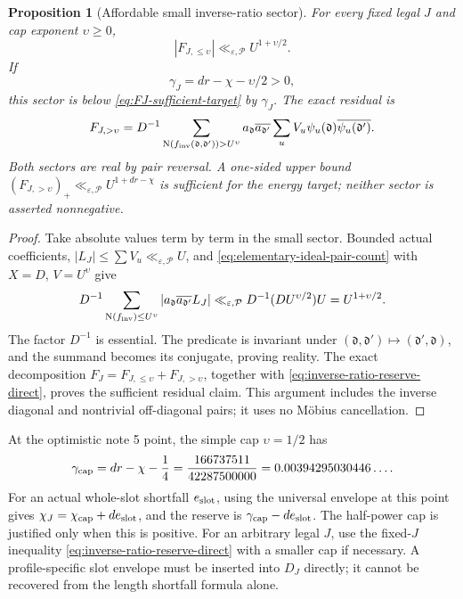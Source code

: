\documentclass[11pt]{article}
\newtheorem{proposition}[theorem]{Proposition}
\theoremstyle{definition}
\newcommand{\N}{\mathrm N}
\newcommand{\eps}{\varepsilon}
\newcommand{\lls}{\ll_{\eps,\mathcal P}}
\begin{document}
\begin{proposition}[Affordable small inverse-ratio sector]
\label{prop:small-inverse-ratio-direct}
For every fixed legal \(J\) and cap exponent \(\upsilon\ge0\),
\begin{equation}
 |F_{J,\le\upsilon}|\lls U^{1+\upsilon/2}.
 \label{eq:small-inverse-ratio-bound-direct}
\end{equation}
If
\begin{equation}
 \gamma_J=dr-\chi-\upsilon/2>0,
 \label{eq:inverse-ratio-reserve-direct}
\end{equation}
this sector is below \eqref{eq:FJ-sufficient-target} by \(\gamma_J\).
The exact residual is
\begin{equation}
 F_{J,>\upsilon}=D^{-1}
   \sum_{\N(f_{\rm inv}(\mathfrak d,\mathfrak d'))>U^\upsilon}
     a_{\mathfrak d}\overline{a_{\mathfrak d'}}
     \sum_u V_u\psi_u(\mathfrak d)
                         \overline{\psi_u(\mathfrak d')}.
 \label{eq:actual-large-inverse-ratio-target}
\end{equation}
Both sectors are real by pair reversal.  A one-sided upper bound
\((F_{J,>\upsilon})_+\lls U^{1+dr-\chi}\) is sufficient for the energy
target; neither sector is asserted nonnegative.
\end{proposition}
\begin{proof}
Take absolute values term by term in the small sector.  Bounded actual
coefficients, \(|L_J|\le\sum V_u\lls U\), and
\eqref{eq:elementary-ideal-pair-count} with \(X=D\), \(V=U^\upsilon\)
give
\[
 D^{-1}\sum_{\N(f_{\rm inv})\le U^\upsilon}
          |a_{\mathfrak d}\overline{a_{\mathfrak d'}}L_J|
 \lls D^{-1}(DU^{\upsilon/2})U=U^{1+\upsilon/2}.
\]
The factor \(D^{-1}\) is essential.  The predicate is invariant under
\((\mathfrak d,\mathfrak d')\mapsto(\mathfrak d',\mathfrak d)\),
and the summand becomes its conjugate, proving reality.  The exact
decomposition \(F_J=F_{J,\le\upsilon}+F_{J,>\upsilon}\), together with
\eqref{eq:inverse-ratio-reserve-direct}, proves the sufficient residual
claim.  This argument includes the inverse diagonal and nontrivial
off-diagonal pairs; it uses no Möbius cancellation.
\end{proof}

At the optimistic note 5 point, the simple cap \(\upsilon=1/2\) has
\begin{equation}
 \gamma_{\rm cap}=dr-\chi-\frac14
       =\frac{166737511}{42287500000}
       =0.00394295030446\ldots.
 \label{eq:exact-half-cap-reserve}
\end{equation}
For an actual whole-slot shortfall \(e_{\rm slot}\), using the universal
envelope at this point gives
\(\chi_J=\chi_{\rm cap}+de_{\rm slot}\), and the reserve is
\(\gamma_{\rm cap}-de_{\rm slot}\).  The half-power cap is justified
only when this is positive.  For an arbitrary legal \(J\), use the
fixed-\(J\) inequality \eqref{eq:inverse-ratio-reserve-direct} with
a smaller cap if necessary.  A profile-specific slot envelope must be
inserted into \(D_J\) directly; it cannot be recovered from the length
shortfall formula alone.
\end{document}
